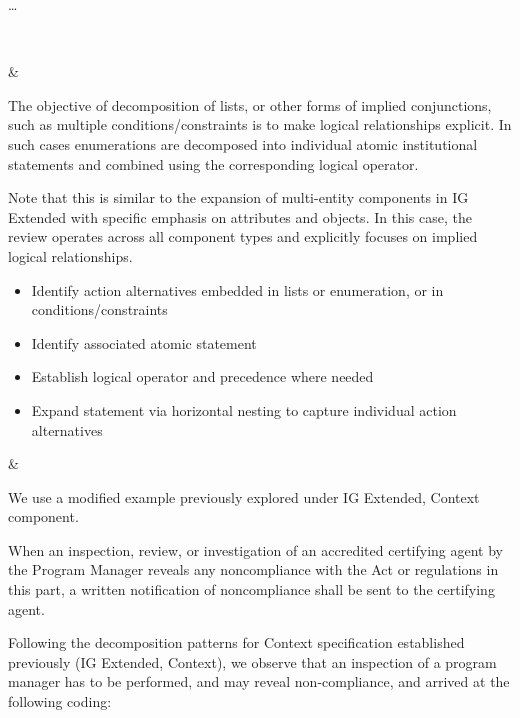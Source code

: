\begin{landscape}
\begin{longtable}{\tabledims}
\dots

\\

\hypertarget{tablink:LogicalRelationshipsAmongStatementComponents}{\EntryLogicalRelationshipsAmongComponents}

&

The objective of decomposition of lists, or other forms of implied conjunctions, such as multiple conditions/constraints is to make logical relationships explicit. In such cases enumerations are decomposed into individual atomic institutional statements and combined using the corresponding logical operator.

Note that this is similar to the expansion of multi-entity components in IG Extended with specific emphasis on attributes and objects. In this case, the review operates across all component types and explicitly focuses on implied logical relationships.

\sp


\begin{itemize}
    \item Identify action alternatives embedded in lists or enumeration, or in conditions/constraints
    \item Identify associated atomic statement
    \item Establish logical operator and precedence where needed
    \item Expand statement via horizontal nesting to capture individual action alternatives
\end{itemize}

&

We use a modified example previously explored under IG Extended, Context component.

\sp


\begin{exi}When an inspection, review, or investigation of an accredited certifying agent by the Program Manager reveals any noncompliance with the Act or regulations in this part, a written notification of noncompliance shall be sent to the certifying agent.\end{exi}

\sp

Following the decomposition patterns for Context specification established previously (IG Extended, Context), we observe that an inspection of a program manager has to be performed, and may reveal non-compliance, and arrived at the following coding:


\end{longtable}
\end{landscape}
